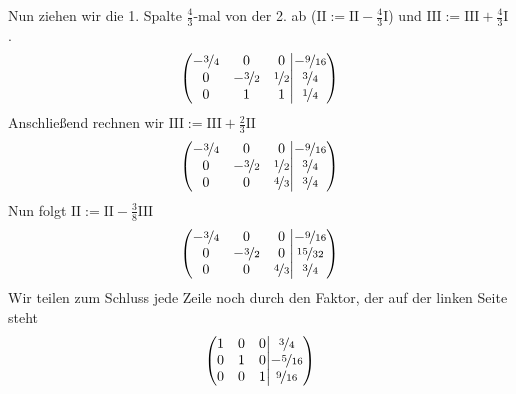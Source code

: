 \documentclass[11pt,a4paper,DIV=12]{scrartcl}
\begin{document}
Nun ziehen wir die 1. Spalte $\frac{4}{3}$-mal von der 2. ab ($\mathrm{II}:=\mathrm{II}-\frac{4}{3}\mathrm{I}$) und $\mathrm{III}:=\mathrm{III}+\frac{4}{3}\mathrm{I}$.
\begin{gather}
	\left\lparen\begin{matrix}
		-\nicefrac{3}{4} & 0 & 0 \\
		0 & -\nicefrac{3}{2} & \nicefrac{1}{2} \\
		0 & 1 & 1
	\end{matrix}\middle\vert\begin{matrix}
		-\nicefrac{9}{16} \\
		\nicefrac{3}{4} \\
		\nicefrac{1}{4}
	\end{matrix}\right\rparen
\end{gather}
Anschließend rechnen wir $\mathrm{III}:=\mathrm{III}+\frac{2}{3}\mathrm{II}$
\begin{gather}
	\left\lparen\begin{matrix}
		-\nicefrac{3}{4} & 0 & 0 \\
		0 & -\nicefrac{3}{2} & \nicefrac{1}{2} \\
		0 & 0 & \nicefrac{4}{3}
	\end{matrix}\middle\vert\begin{matrix}
		-\nicefrac{9}{16} \\
		\nicefrac{3}{4} \\
		\nicefrac{3}{4}
	\end{matrix}\right\rparen
\end{gather}
Nun folgt $\mathrm{II}:=\mathrm{II}-\frac{3}{8}\mathrm{III}$
\begin{gather}
	\left\lparen\begin{matrix}
		-\nicefrac{3}{4} & 0 & 0 \\
		0 & -\nicefrac{3}{2} & 0 \\
		0 & 0 & \nicefrac{4}{3}
	\end{matrix}\middle\vert\begin{matrix}
		-\nicefrac{9}{16} \\
		\nicefrac{15}{32} \\
		\nicefrac{3}{4}
	\end{matrix}\right\rparen
\end{gather}
Wir teilen zum Schluss jede Zeile noch durch den Faktor, der auf der linken Seite steht
\begin{gather}
	\left\lparen\begin{matrix}
		1 & 0 & 0 \\
		0 & 1 & 0 \\
		0 & 0 & 1
	\end{matrix}\middle\vert\begin{matrix}
		\nicefrac{3}{4} \\
		-\nicefrac{5}{16} \\
		\nicefrac{9}{16}
	\end{matrix}\right\rparen
\end{gather}
\end{document}
